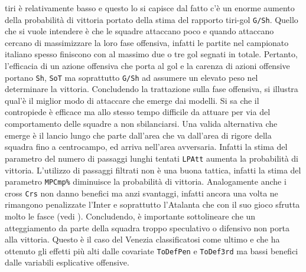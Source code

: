 tiri è relativamente basso e questo lo si capisce dal fatto c'è un enorme aumento della probabilità di vittoria portato della stima del rapporto tiri-gol \texttt{G/Sh}. Quello che si vuole intendere è che le squadre attaccano poco e quando attaccano cercano di massimizzare la loro fase offensiva, infatti le partite nel campionato italiano spesso finiscono con al massimo due o tre gol segnati in totale. Pertanto, l'efficacia di un azione offensiva che porta al gol e la carenza di azioni offensive portano \texttt{Sh}, \texttt{SoT} ma soprattutto \texttt{G/Sh} ad assumere un elevato peso nel determinare la vittoria. Concludendo la trattazione sulla fase offensiva, si illustra qual'è il miglior modo di attaccare che emerge dai modelli. Si sa che il contropiede è efficace ma allo stesso tempo difficile da attuare per via del comportamento delle squadre a non sbilanciarsi. Una valida alternativa che emerge è il lancio lungo che parte dall'area che va dall'area di rigore della squadra fino a centrocampo, ed arriva nell'area avversaria. Infatti la stima del parametro del numero di passaggi lunghi tentati \texttt{LPAtt} aumenta la probabilità di vittoria. L'utilizzo di passaggi filtrati non è una buona tattica, infatti la stima del parametro \texttt{MPCmp\%} diminuisce la probabilità di vittoria. Analogamente anche i cross \texttt{Crs} non danno benefici ma anzi svantaggi, infatti ancora una volta ne rimangono penalizzate l'Inter e soprattutto l'Atalanta che con il suo gioco sfrutta molto le fasce (vedi \textit{\cite{ataGioco}}). Concludendo, è importante sottolineare che un atteggiamento da parte della squadra troppo speculativo o difensivo non porta alla vittoria. Questo è il caso del Venezia classificatosi come ultimo e che ha ottenuto gli effetti più alti dalle covariate \texttt{ToDefPen} e \texttt{ToDef3rd} ma bassi benefici dalle variabili esplicative offensive.

